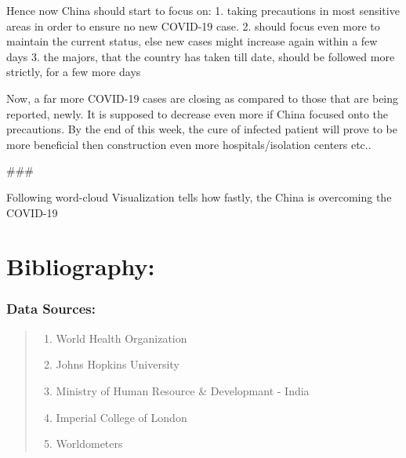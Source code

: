 \documentclass[11pt]{article}
\providecommand{\tightlist}{%
      \setlength{\itemsep}{0pt}\setlength{\parskip}{0pt}}
\begin{document}
    Hence now China should start to focus on: 1. taking precautions in most
sensitive areas in order to ensure no new COVID-19 case. 2. should focus
even more to maintain the current status, else new cases might increase
again within a few days 3. the majors, that the country has taken till
date, should be followed more strictly, for a few more days

Now, a far more COVID-19 cases are closing as compared to those that are
being reported, newly. It is supposed to decrease even more if China
focused onto the precautions. By the end of this week, the cure of
infected patient will prove to be more beneficial then construction even
more hospitals/isolation centers etc.. 

    \#\#\#

Following word-cloud Visualization tells how fastly, the China is
overcoming the COVID-19

    

    \hypertarget{bibliography}{%
\section{Bibliography:}\label{bibliography}}

    \hypertarget{data-sources}{%
\subsubsection{Data Sources:}\label{data-sources}}

    \begin{quote}
\begin{enumerate}
\def\labelenumi{\arabic{enumi}.}
\tightlist
\item
  World Health Organization
\item
  Johns Hopkins University
\item
  Ministry of Human Resource \& Developmant - India
\item
  Imperial College of London
\item
  Worldometers
\end{enumerate}
\end{quote}

    


    
    
    
\end{document}
